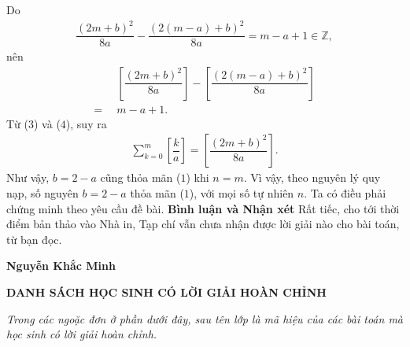 \begin{multicols}{2}
	Do
	\begin{align*}
		\dfrac{{{{\left( {2m \!+\! b} \right)}^2}}}{{8a}} \!-\! \dfrac{{{{\left( {2\left( {m \!-\! a} \right) \!+\! b} \right)}^2}}}{{8a}} \!=\! m \!-\! a \!+\! 1 \!\in\! \mathbb{Z},
	\end{align*}
	nên
	\begin{align*}
		&\left[ {\dfrac{{{{\left( {2m + b} \right)}^2}}}{{8a}}} \right] - \left[ {\dfrac{{{{\left( {2\left( {m - a} \right) + b} \right)}^2}}}{{8a}}} \right] \\
		= \,\,\,&m - a + 1. \tag{$4$}
	\end{align*}
	Từ ($3$) và ($4$), suy ra
	\begin{align*}
		\sum\limits_{k = 0}^m {\left[ {\dfrac{k}{a}} \right]}  = \left[ {\dfrac{{{{\left( {2m + b} \right)}^2}}}{{8a}}} \right].
	\end{align*}
	Như vậy, $b = 2 - a$ cũng thỏa mãn ($1$) khi $n = m$.
	\vskip 0.05cm
	Vì vậy, theo nguyên lý quy nạp, số nguyên $b = 2 - a$ thỏa mãn ($1$), với mọi số tự nhiên $n$.
	\vskip 0.05cm
	Ta có điều phải chứng minh theo yêu cầu đề bài.
	\vskip 0.05cm
	\textbf{\color{thachthuctoanhoc}Bình luận và Nhận xét}
	\vskip 0.05cm
	Rất tiếc, cho tới thời điểm bản thảo vào Nhà in, Tạp chí vẫn chưa nhận được lời giải nào cho bài toán, từ bạn đọc.
	\begin{flushright}
		\textbf{\color{thachthuctoanhoc}Nguyễn Khắc Minh}
	\end{flushright}
\end{multicols}	
\newpage
\centerline{\textbf{\color{thachthuctoanhoc}DANH SÁCH HỌC SINH CÓ LỜI GIẢI HOÀN CHỈNH}}
\vskip 0.05cm
\textit{Trong các ngoặc đơn ở phần dưới đây, sau tên lớp là mã hiệu của các bài toán mà học sinh có lời giải hoàn chỉnh.}
